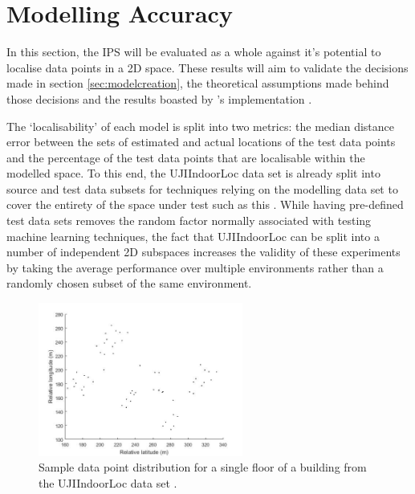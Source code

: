 \documentclass{UoYCSproject}
\begin{document}
	    \section{Modelling Accuracy}
	    \label{sec:modeleval}
        
            In this section, the IPS will be evaluated as a whole against it's potential to localise data points in a 2D space. These results will aim to validate the decisions made in section \ref{sec:modelcreation}, the theoretical assumptions made behind those decisions and the results boasted by \citeauthor{chintalapudi2010indoor}'s implementation \citep{chintalapudi2010indoor}.
            
            The `localisability' of each model is split into two metrics: the median distance error between the sets of estimated and actual locations of the test data points and the percentage of the test data points that are localisable within the modelled space. To this end, the UJIIndoorLoc data set is already split into source and test data subsets for techniques relying on the modelling data set to cover the entirety of the space under test such as this \citep{torres2014ujiindoorloc}. While having pre-defined test data sets removes the random factor normally associated with testing machine learning techniques, the fact that UJIIndoorLoc can be split into a number of independent 2D subspaces increases the validity of these experiments by taking the average performance over multiple environments rather than a randomly chosen subset of the same environment.
            
            \begin{figure}[h]
                \label{fig:datapoints}
                \centering
                \includegraphics[width=0.6\textwidth]{datapoints.jpg}
                \caption{Sample data point distribution for a single floor of a building from the UJIIndoorLoc data set \citep{torres2014ujiindoorloc}.}
            \end{figure}
            
\end{document}
